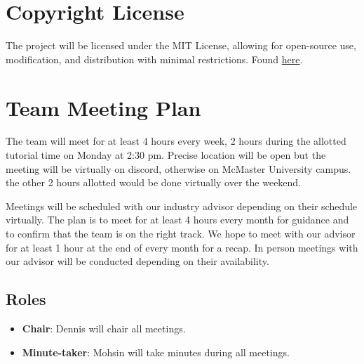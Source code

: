 \documentclass{article}
\begin{document}


\section{Copyright License}
The project will be licensed under the MIT License, allowing for open-source use, modification, 
and distribution with minimal restrictions. Found \href{https://github.com/lilweege/SyntaxSentinels/blob/main/LICENSE}{here}.

\section{Team Meeting Plan}

The team will meet for at least 4 hours every week, 2 hours during the allotted tutorial 
time on Monday at 2:30 pm. Precise location will be open but the meeting will be virtually on discord, 
otherwise on McMaster University campus. the other 2 hours allotted would be done virtually over the weekend.


Meetings will be scheduled with our industry advisor depending on their schedule virtually. 
The plan is to meet for at least 4 hours every month for guidance and to confirm that the team 
is on the right track. We hope to meet with our advisor for at least 1 hour at the end of every 
month for a recap. In person meetings with our advisor will be conducted depending on their availability.

\subsection*{Roles}

\begin{itemize}
    \item \textbf{Chair}: Dennis will chair all meetings.
    \item \textbf{Minute-taker}: Mohsin will take minutes during all meetings.
\end{itemize}
\end{document}
